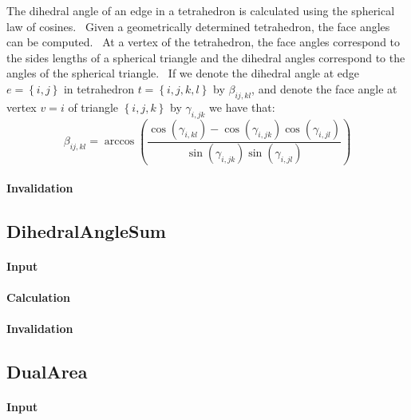 The dihedral angle of an edge in a tetrahedron is calculated using the
spherical law of cosines. \ Given a geometrically determined tetrahedron,
the face angles can be computed. \ At a vertex of the tetrahedron, the face
angles correspond to the sides lengths of a spherical triangle and the
dihedral angles correspond to the angles of the spherical triangle. \ If we
denote the dihedral angle at edge $e=\left\{ i,j\right\} $ in tetrahedron $%
t=\left\{ i,j,k,l\right\} $ by $\beta _{ij,kl}$, and denote the face angle
at vertex $v=i$ of triangle $\left\{ i,j,k\right\} $ by $\gamma _{i,jk}$ we
have that:%
\begin{equation*}
\beta _{ij,kl}=\arccos \left( \frac{\cos \left( \gamma _{i,kl}\right) -\cos
\left( \gamma _{i,jk}\right) \cos \left( \gamma _{i,jl}\right) }{\sin \left(
\gamma _{i,jk}\right) \sin \left( \gamma _{i,jl}\right) }\right)
\end{equation*}

\paragraph{Invalidation}

\bigskip

\subsection{DihedralAngleSum}

\paragraph{Input}

\paragraph{Calculation}

\paragraph{Invalidation}

\bigskip

\subsection{DualArea}

\paragraph{Input}

